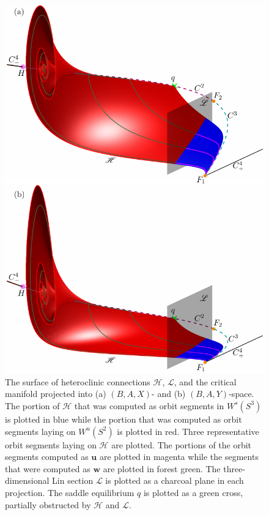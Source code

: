 \documentclass{ws-ijbc}
\begin{document}
\begin{figure}[H]
\centering
\includegraphics[]{./figures/MKMO_9.pdf}
\caption{The surface of heteroclinic connections $\mathscr{H}$, $\mathscr{L}$, and the critical manifold projected into (a) $(B,A,X)$- and (b) $(B,A,Y)$-space.  The portion of $\mathscr{H}$ that was computed as orbit segments in $W^s(S^3)$ is plotted in blue while the portion that was computed as orbit segments laying on $W^u(S^2)$ is plotted in red.  Three representative orbit segments laying on $\mathscr{H}$ are plotted.  The portions of the orbit segments computed as $\mathbf{u}$ are plotted in magenta while the segments that were computed as $\mathbf{w}$ are plotted in forest green.  The three-dimensional Lin section $\mathscr{L}$ is plotted as a charcoal plane in each projection.  The saddle equilibrium $q$ is plotted as a green cross, partially obstructed by $\mathscr{H}$ and $\mathscr{L}$.}
\label{heteroclinic}
\end{figure}
\end{document}
